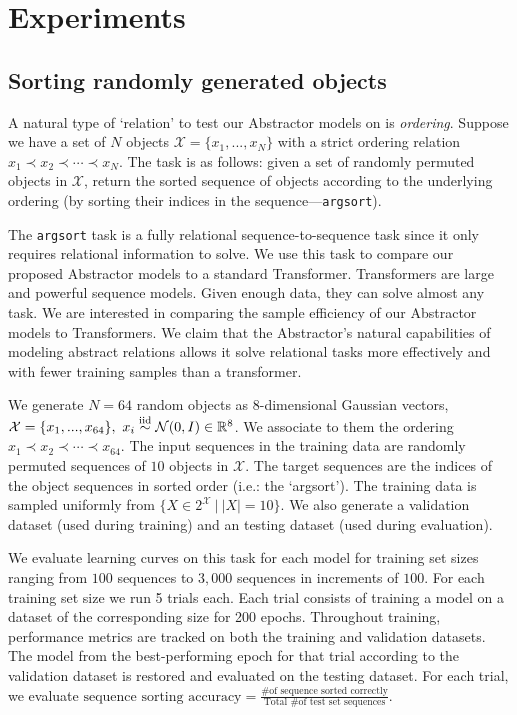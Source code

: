 \section{Experiments}
\label{sec:experiments}

\subsection{Sorting randomly generated objects}
\label{ssec:random_object_argsort}
\def\subtask#1{\noindent{\it\bfseries #1.}}

A natural type of `relation' to test our Abstractor models on is \textit{ordering}. Suppose we have a set of $N$ objects $\mathcal{X} = \{ x_1 , ..., x_N \}$ with a strict ordering relation $x_1 \prec x_2 \prec \cdots \prec x_N$. The task is as follows: given a set of randomly permuted objects in $\mathcal{X}$, return the sorted sequence of objects according to the underlying ordering (by sorting their indices in the sequence---\texttt{argsort}).

The \texttt{argsort} task is a fully relational sequence-to-sequence task since it only requires relational information to solve. We use this task to compare our proposed Abstractor models to a standard Transformer. Transformers are large and powerful sequence models. Given enough data, they can solve almost any task. We are interested in comparing the sample efficiency of our Abstractor models to Transformers. We claim that the Abstractor's natural capabilities of modeling abstract relations allows it solve relational tasks more effectively and with fewer training samples than a transformer.

\subtask{Random object sorting task} We generate $N=64$ random objects as 8-dimensional Gaussian vectors, $\mathcal{X} = \{ x_1 , ..., x_{64} \}, \ x_i \overset{\mathrm{iid}}{\sim} \mathcal{N}(0, I) \in \mathbb{R}^8$. We associate to them the ordering $x_1 \prec x_2 \prec \cdots \prec x_{64}$. The input sequences in the training data are randomly permuted sequences of $10$ objects in $\mathcal{X}$. The target sequences are the indices of the object sequences in sorted order (i.e.: the `argsort'). The training data is sampled uniformly from $\{ X \in 2^\mathcal{X} \ \vert \ |X| = 10\}$. We also generate a validation dataset (used during training) and an testing dataset (used during evaluation).

\subtask{Evaluation} We evaluate learning curves on this task for each model for training set sizes ranging from $100$ sequences to $3,000$ sequences in increments of $100$. For each training set size we run 5 trials each. Each trial consists of training a model on a dataset of the corresponding size for 200 epochs. Throughout training, performance metrics are tracked on both the training and validation datasets. The model from the best-performing epoch for that trial according to the validation dataset is restored and evaluated on the testing dataset. For each trial, we evaluate $\text{sequence sorting accuracy} = \frac{\text{\# of sequence sorted correctly}}{\text{Total \# of test set sequences}}$.

